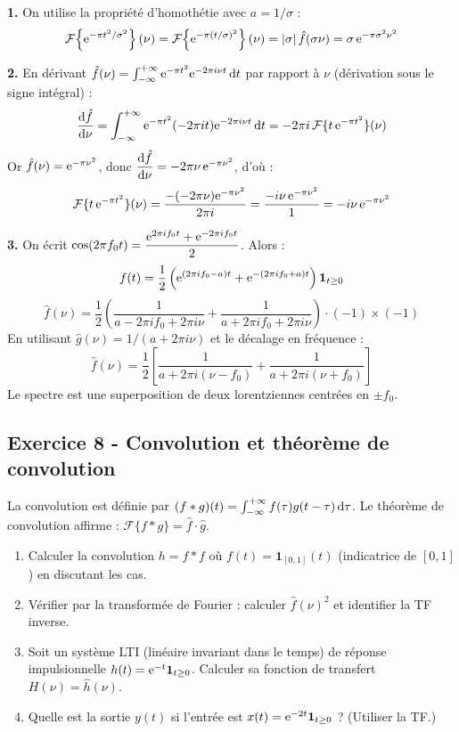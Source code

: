 \documentclass[12pt,a4paper]{article}
\begin{document}
\begin{boitecorrige}
\textbf{1.} On utilise la propriété d'homothétie avec $a = 1/\sigma$ :
\[
\mathcal{F}\!\left\{\mathrm{e}^{-\pi t^2/\sigma^2}\right\}(\nu) = \mathcal{F}\!\left\{\mathrm{e}^{-\pi (t/\sigma)^2}\right\}(\nu) = |\sigma|\,\hat{f}(\sigma\nu) = \sigma\,\mathrm{e}^{-\pi\sigma^2\nu^2}
\]

\textbf{2.} En dérivant $\hat{f}(\nu) = \int_{-\infty}^{+\infty}\mathrm{e}^{-\pi t^2}\mathrm{e}^{-2\pi i\nu t}\,\mathrm{d} t$ par rapport à $\nu$ (dérivation sous le signe intégral) :
\[
\frac{\mathrm{d}\hat{f}}{\mathrm{d}\nu} = \int_{-\infty}^{+\infty}\mathrm{e}^{-\pi t^2}(-2\pi it)\mathrm{e}^{-2\pi i\nu t}\,\mathrm{d} t = -2\pi i\,\mathcal{F}\{t\,\mathrm{e}^{-\pi t^2}\}(\nu)
\]
Or $\hat{f}(\nu) = \mathrm{e}^{-\pi\nu^2}$, donc $\dfrac{\mathrm{d}\hat{f}}{\mathrm{d}\nu} = -2\pi\nu\,\mathrm{e}^{-\pi\nu^2}$, d'où :
\[
\mathcal{F}\{t\,\mathrm{e}^{-\pi t^2}\}(\nu) = \frac{-(-2\pi\nu)\mathrm{e}^{-\pi\nu^2}}{2\pi i} = \frac{-i\nu\,\mathrm{e}^{-\pi\nu^2}}{1} = -i\nu\,\mathrm{e}^{-\pi\nu^2}
\]

\textbf{3.} On écrit $\cos(2\pi f_0 t) = \dfrac{\mathrm{e}^{2\pi if_0 t}+\mathrm{e}^{-2\pi if_0 t}}{2}$. Alors :
\[
f(t) = \frac{1}{2}\left(\mathrm{e}^{(2\pi if_0 - a)t} + \mathrm{e}^{-(2\pi if_0+a)t}\right)\mathbf{1}_{t\geq0}
\]
\[
\hat{f}(\nu) = \frac{1}{2}\left(\frac{1}{a-2\pi if_0 + 2\pi i\nu} + \frac{1}{a+2\pi if_0+2\pi i\nu}\right)\cdot(-1)\times(-1)
\]
En utilisant $\hat{g}(\nu) = 1/(a+2\pi i\nu)$ et le décalage en fréquence :
\[
\hat{f}(\nu) = \frac{1}{2}\left[\frac{1}{a+2\pi i(\nu-f_0)} + \frac{1}{a+2\pi i(\nu+f_0)}\right]
\]
Le spectre est une superposition de deux lorentziennes centrées en $\pm f_0$.
\end{boitecorrige}

\subsection*{Exercice 8 - Convolution et théorème de convolution \niveau{\difficile}}

\begin{boiteexercice}
La convolution est définie par $(f*g)(t) = \int_{-\infty}^{+\infty}f(\tau)g(t-\tau)\,\mathrm{d}\tau$. Le théorème de convolution affirme : $\mathcal{F}\{f*g\} = \hat{f}\cdot\hat{g}$.
\begin{enumerate}
  \item Calculer la convolution $h = f*f$ où $f(t) = \mathbf{1}_{[0,1]}(t)$ (indicatrice de $[0,1]$) en discutant les cas.
  \item Vérifier par la transformée de Fourier : calculer $\hat{f}(\nu)^2$ et identifier la TF inverse.
  \item Soit un système LTI (linéaire invariant dans le temps) de réponse impulsionnelle $h(t) = \mathrm{e}^{-t}\mathbf{1}_{t\geq0}$. Calculer sa fonction de transfert $H(\nu) = \hat{h}(\nu)$.
  \item Quelle est la sortie $y(t)$ si l'entrée est $x(t) = \mathrm{e}^{-2t}\mathbf{1}_{t\geq0}$ ? (Utiliser la TF.)
\end{enumerate}
\end{boiteexercice}
\end{document}
